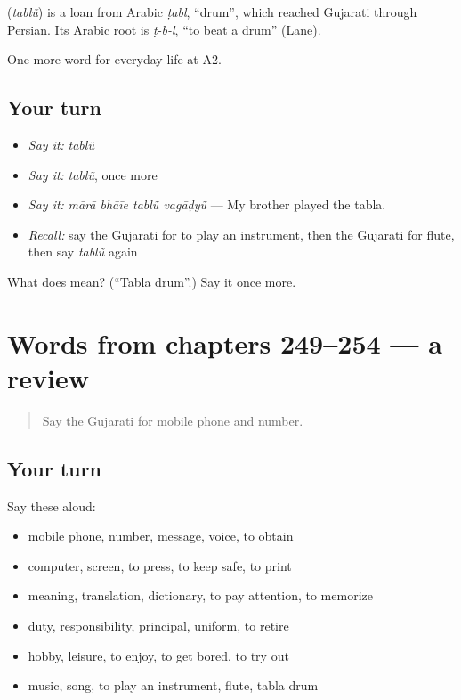 \begin{cousinweb}
\textbf{} (\emph{tablũ}) is a loan from Arabic \emph{ṭabl}, \textquotedblleft{}drum\textquotedblright{}, which reached Gujarati through Persian. Its Arabic root is \emph{ṭ-b-l}, \textquotedblleft{}to beat a drum\textquotedblright{} (Lane).
\end{cousinweb}

\begin{grammarlens}[title={What you've built}]
One more word for everyday life at A2.
\end{grammarlens}

\subsection*{Your turn}
\begin{itemize}
\raggedright
  \item \emph{Say it:} \emph{tablũ}
  \item \emph{Say it:} \emph{tablũ}, once more
  \item \emph{Say it:} \emph{mārā bhāīe tablũ vagāḍyũ} — My brother played the tabla.
  \item \emph{Recall:} say the Gujarati for to play an instrument, then the Gujarati for flute, then say \emph{tablũ} again
\end{itemize}

\begin{tcolorbox}[breakable,colback=teal!4,colframe=teal!35!black,title={Before you move on}]
What does  mean? (\textquotedblleft{}Tabla drum\textquotedblright{}.) Say it once more.
\end{tcolorbox}
\section[(dialogue)]{Words from chapters 249–254 — a review}

\label{lesson:GU-R254-review-249-254}



\begin{quote}
Say the Gujarati for mobile phone and number.
\end{quote}

\subsection*{Your turn}
Say these aloud:

\begin{itemize}
\raggedright
  \item mobile phone, number, message, voice, to obtain
  \item computer, screen, to press, to keep safe, to print
  \item meaning, translation, dictionary, to pay attention, to memorize
  \item duty, responsibility, principal, uniform, to retire
  \item hobby, leisure, to enjoy, to get bored, to try out
  \item music, song, to play an instrument, flute, tabla drum
\end{itemize}

